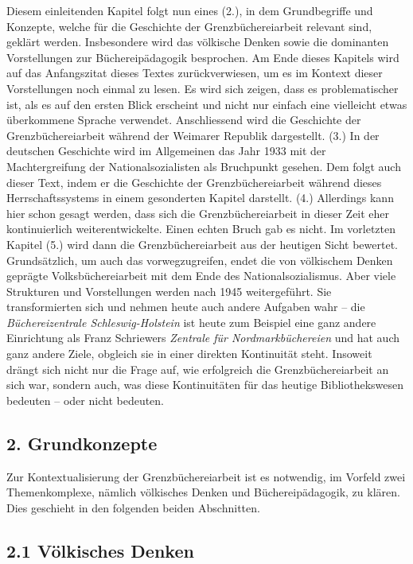 \documentclass[a4paper,
fontsize=11pt,
oneside,
numbers=noperiodatend,
parskip=half-,
bibliography=totoc,
final
]{scrartcl}
\begin{document}
Diesem einleitenden Kapitel folgt nun eines (2.), in dem Grundbegriffe
und Konzepte, welche für die Geschichte der Grenzbüchereiarbeit relevant
sind, geklärt werden. Insbesondere wird das völkische Denken sowie die
dominanten Vorstellungen zur Büchereipädagogik besprochen. Am Ende
dieses Kapitels wird auf das Anfangszitat dieses Textes zurückverwiesen,
um es im Kontext dieser Vorstellungen noch einmal zu lesen. Es wird sich
zeigen, dass es problematischer ist, als es auf den ersten Blick
erscheint und nicht nur einfach eine vielleicht etwas überkommene
Sprache verwendet. Anschliessend wird die Geschichte der
Grenzbüchereiarbeit während der Weimarer Republik dargestellt. (3.) In
der deutschen Geschichte wird im Allgemeinen das Jahr 1933 mit der
Machtergreifung der Nationalsozialisten als Bruchpunkt gesehen. Dem
folgt auch dieser Text, indem er die Geschichte der Grenzbüchereiarbeit
während dieses Herrschaftssystems in einem gesonderten Kapitel
darstellt. (4.) Allerdings kann hier schon gesagt werden, dass sich die
Grenzbüchereiarbeit in dieser Zeit eher kontinuierlich
weiterentwickelte. Einen echten Bruch gab es nicht. Im vorletzten
Kapitel (5.) wird dann die Grenzbüchereiarbeit aus der heutigen Sicht
bewertet. Grundsätzlich, um auch das vorwegzugreifen, endet die von
völkischem Denken geprägte Volksbüchereiarbeit mit dem Ende des
Nationalsozialismus. Aber viele Strukturen und Vorstellungen werden nach
1945 weitergeführt. Sie transformierten sich und nehmen heute auch
andere Aufgaben wahr -- die \emph{Büchereizentrale Schleswig-Holstein}
ist heute zum Beispiel eine ganz andere Einrichtung als Franz Schriewers
\emph{Zentrale für Nordmarkbüchereien} und hat auch ganz andere Ziele,
obgleich sie in einer direkten Kontinuität steht. Insoweit drängt sich
nicht nur die Frage auf, wie erfolgreich die Grenzbüchereiarbeit an sich
war, sondern auch, was diese Kontinuitäten für das heutige
Bibliothekswesen bedeuten -- oder nicht bedeuten.

\hypertarget{grundkonzepte}{%
\subsection{2. Grundkonzepte}\label{grundkonzepte}}

Zur Kontextualisierung der Grenzbüchereiarbeit ist es notwendig, im
Vorfeld zwei Themenkomplexe, nämlich völkisches Denken und
Büchereipädagogik, zu klären. Dies geschieht in den folgenden beiden
Abschnitten.

\hypertarget{vuxf6lkisches-denken}{%
\subsection{2.1 Völkisches Denken}\label{vuxf6lkisches-denken}}
\end{document}
